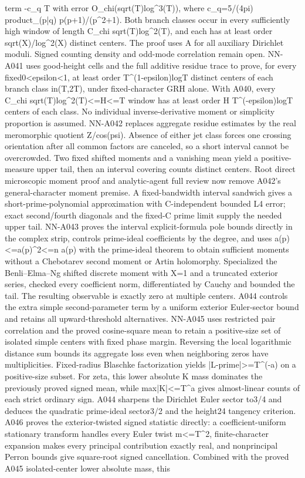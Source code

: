 term -c\_q T with error O\_chi(sqrt(T)log\textasciicircum{}3(T)), where c\_q=5/(4pi) product\_(p|q) p(p+1)/(p\textasciicircum{}2+1). Both branch classes occur in every sufficiently high window of length C\_chi sqrt(T)log\textasciicircum{}2(T), and each has at least order sqrt(X)/log\textasciicircum{}2(X) distinct centers. The proof uses A for all auxiliary Dirichlet moduli. Signed counting density and odd-mode correlation remain open. NN-A041 uses good-height cells and the full additive residue trace to prove, for every fixed0<epsilon<1, at least order T\textasciicircum{}(1-epsilon)logT distinct centers of each branch class in(T,2T), under fixed-character GRH alone. With A040, every C\_chi sqrt(T)log\textasciicircum{}2(T)<=H<=T window has at least order H T\textasciicircum{}(-epsilon)logT centers of each class. No individual inverse-derivative moment or simplicity proportion is assumed. NN-A042 replaces aggregate residue estimates by the real meromorphic quotient Z/cos(psi). Absence of either jet class forces one crossing orientation after all common factors are canceled, so a short interval cannot be overcrowded. Two fixed shifted moments and a vanishing mean yield a positive-measure upper tail, then an interval covering counts distinct centers. Root direct microscopic moment proof and analytic-agent full review now remove A042's general-character moment premise. A fixed-bandwidth interval sandwich gives a short-prime-polynomial approximation with C-independent bounded L4 error; exact second/fourth diagonals and the fixed-C prime limit supply the needed upper tail. NN-A043 proves the interval explicit-formula pole bounds directly in the complex strip, controls prime-ideal coefficients by the degree, and uses a(p)<=a(p)\textasciicircum{}2<=n a(p) with the prime-ideal theorem to obtain sufficient moments without a Chebotarev second moment or Artin holomorphy. Specialized the Benli--Elma--Ng shifted discrete moment with X=1 and a truncated exterior series, checked every coefficient norm, differentiated by Cauchy and bounded the tail. The resulting observable is exactly zero at multiple centers. A044 controls the extra simple second-parameter term by a uniform exterior Euler-sector bound and retains all upward-threshold alternatives. NN-A045 uses restricted pair correlation and the proved cosine-square mean to retain a positive-size set of isolated simple centers with fixed phase margin. Reversing the local logarithmic distance sum bounds its aggregate loss even when neighboring zeros have multiplicities. Fixed-radius Blaschke factorization yields |L-prime|>=T\textasciicircum{}(-a) on a positive-size subset. For zeta, this lower absolute K mass dominates the previously proved signed mean, while max|K|<=T\textasciicircum{}a gives almost-linear counts of each strict ordinary sign. A044 sharpens the Dirichlet Euler sector to3/4 and deduces the quadratic prime-ideal sector3/2 and the height24 tangency criterion. A046 proves the exterior-twisted signed statistic directly: a coefficient-uniform stationary transform handles every Euler twist m<=T\textasciicircum{}2, finite-character expansion makes every principal contribution exactly real, and nonprincipal Perron bounds give square-root signed cancellation. Combined with the proved A045 isolated-center lower absolute mass, this 